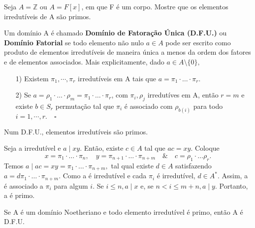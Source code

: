 \documentclass[AlgebraII/algebraII_notes.tex]{subfiles}
\begin{document}
\begin{example}[Exercício]
	Seja \(A = \mathbb{Z}\) ou \(A = F[x]\), em que F é um corpo. Mostre que os elementos irredutíveis de A são primos.
\end{example}
\begin{def*}
	Um domínio A é chamado \textbf{Domínio de Fatoração Única (D.F.U.)} ou \textbf{Domínio Fatorial} se
	todo elemento não nulo \(a\in A\) pode ser escrito como produto de elementos irredutíveis de maneira única a menos
	da ordem dos fatores e de elementos associados. Mais explicitamente, dado \(a\in A\setminus{\{0\}},\)
	\begin{itemize}
		\item[1)] Existem \(\pi_{1}, \cdots, \pi_{r}\) irredutíveis em A tais que \(a = \pi_{1}\cdot \dotsc \cdot \pi_{r}.\)
		\item[2)] Se \(a = \rho_{1}\cdot\dotsc \cdot \rho_{m} = \pi_{1}\cdot \dotsc \cdot \pi_{r}\), com \(\pi_{i}, \rho_{j}\) irredutíves em A, então \(r = m\)
		      e existe \(b\in S_{r}\) permutação tal que \(\pi_{i}\) é associado com \(\rho_{b(i)}\) para todo \(i=1, \cdots, r. \quad\square\)
	\end{itemize}
\end{def*}
\begin{prop*}
	Num D.F.U., elementos irredutíveis são primos.
\end{prop*}
\begin{proof*}
	Seja a irredutível e \(a\mid xy\). Então, existe \(c\in A\) tal que \(ac = xy.\) Coloque
	\[
		x = \pi_{1} \cdot \dotsc \cdot \pi_{n},\quad y = \pi_{n+1}\cdot \dotsc \cdot \pi_{n+m}\quad\&\quad c=\rho_{1}\cdot \dotsc \rho_{r}.
	\]
	Temos \(a\mid ac = xy = \pi_{1}\cdot \dotsc \cdot \pi_{n+m},\) tal qual existe \(d\in A\) satisfazendo \(a = d\pi_{1}\cdot \dotsc \cdot \pi_{n+m}.\) Como a é
	irredutível e cada \(\pi_{i}\) é irredutível, \(d\in A^{*}.\) Assim, a é associado a \(\pi_{i}\) para algum \(i.\) Se \(i\leq n, a\mid x\) e, se \(n < i\leq m + n, a \mid y.\)
	Portanto, a é primo. \qedsymbol
\end{proof*}
\begin{prop*}
	Se A é um domínio Noetheriano e todo elemento irredutível é primo, então A é D.F.U.
\end{prop*}
\end{document}
